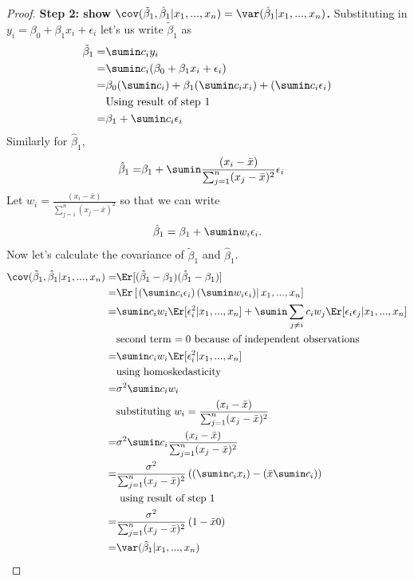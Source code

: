 \begin{proof}
  \textbf{Step 2:  show $\cov(\tilde{\beta}_1, \hat{\beta}_1|x_1,...,x_n) =
    \var(\hat{\beta}_1|x_1, ..., x_n)$.} 
  Substituting in $y_i =
  \beta_0 + \beta_1 x_i + \epsilon_i$ let's us write $\tilde{\beta}_1$ as
  \begin{align*}
    \tilde{\beta}_1 = & \sumin c_i y_i \\
    = & \sumin c_i (\beta_0 + \beta_1 x_i  + \epsilon_i) \\
    = & \beta_0 (\sumin c_i) + \beta_1 (\sumin c_i x_i) + (\sumin c_i
        \epsilon_i) \\
    & \text{Using result of step 1} \\
    = & \beta_1 + \sumin c_i \epsilon_i
  \end{align*}
  Similarly for $\hat{\beta}_1$, 
  \begin{align*}
    \hat{\beta}_1 = & \beta_1 + \sumin \frac{(x_i
                      -\bar{x})}{\sum_{j=1}^n (x_j - \bar{x})^2}
                      \epsilon_i  
  \end{align*}
  Let $w_i = \frac{(x_i-\bar{x})}{\sum_{j=1}^n (x_j - \bar{x})^2}$ so
  that we can write 
  \[ \hat{\beta}_1 = \beta_1 + \sumin w_i \epsilon_i. \]
  Now let's calculate the covariance of $\tilde{\beta}_1$ and
  $\hat{\beta}_1$. 
  \begin{align*}
    \cov(\tilde{\beta}_1, \hat{\beta}_1 | x_1, ..., x_n) = 
    &
      \Er[(\tilde{\beta}_1 - \beta_1) (\hat{\beta}_1 - \beta_1) ] \\
    = & \Er\left[ \left. \left( \sumin c_i \epsilon_i \right) \left(\sumin
        w_i \epsilon_i \right)\right\vert x_1, ..., x_n \right] \\
  = & \sumin c_i w_i \Er[\epsilon_i^2 | x_1, ..., x_n ] + \sumin
        \sum_{j\neq i} c_i w_j \Er[\epsilon_i \epsilon_j  | x_1, ...,
        x_n] \\
    & \text{second term $= 0$ because of independent observations} \\
    = &  \sumin c_i w_i \Er[\epsilon_i^2 | x_1, ..., x_n] \\
    & \text{using homoskedasticity} \\
    = & \sigma^2 \sumin c_i w_i \\
    & \text{substituting } w_i = \frac{(x_i-\bar{x})}
      {\sum_{j=1}^n (x_j- \bar{x})^2} \\
    = & \sigma^2 \sumin c_i \frac{(x_i-\bar{x})}{\sum_{j=1}^n (x_j -
        \bar{x})^2} \\
    = & \frac{\sigma^2}{\sum_{j=1}^n (x_j -
        \bar{x})^2} \left((\sumin c_i x_i) - (\bar{x} \sumin c_i)
        \right) \\
    & \text{ using result of step 1} \\
    = & \frac{\sigma^2}{\sum_{j=1}^n (x_j -
        \bar{x})^2} \left(1 - \bar{x} 0\right)\\
    = & \var(\hat{\beta}_1 | x_1, ..., x_n)
  \end{align*}
  

\end{proof}
